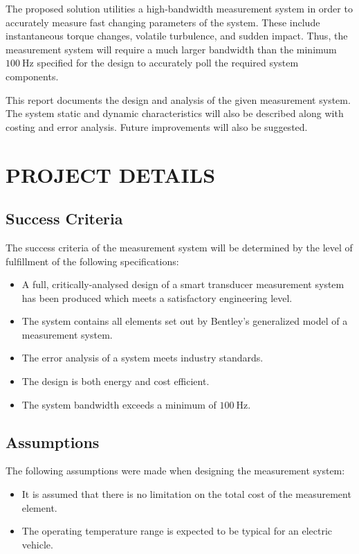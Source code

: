 \documentclass[10pt,twocolumn]{witseiepaper}
\begin{document}
The proposed solution utilities a high-bandwidth measurement system in order to accurately measure fast changing parameters of the system. These include instantaneous torque changes, volatile turbulence, and sudden impact. Thus, the measurement system will require a much larger bandwidth than the minimum $100~\mathrm{Hz}$ specified for the design to accurately poll the required system components.

This report documents the design and analysis of the given measurement system. The system static and dynamic characteristics will also be described along with costing and error analysis. Future improvements will also be suggested.

\section{PROJECT DETAILS}

\subsection{Success Criteria}

The success criteria of the measurement system will be determined by the level of fulfillment of the following specifications:

\begin{itemize}
	\item A full, critically-analysed design of a smart transducer measurement system has been produced which meets a satisfactory engineering level.
	\item The system contains all elements set out by Bentley's generalized model of a measurement system.
	\item The error analysis of a system meets industry standards.
	\item The design is both energy and cost efficient.
	\item The system bandwidth exceeds a minimum of $100~\mathrm{Hz}$.
\end{itemize}

\subsection{Assumptions}

The following assumptions were made when designing the measurement system:

\begin{itemize}
	\item It is assumed that there is no limitation on the total cost of the measurement element.
	\item The operating temperature range is expected to be typical for an electric vehicle.
\end{itemize}
\end{document}
